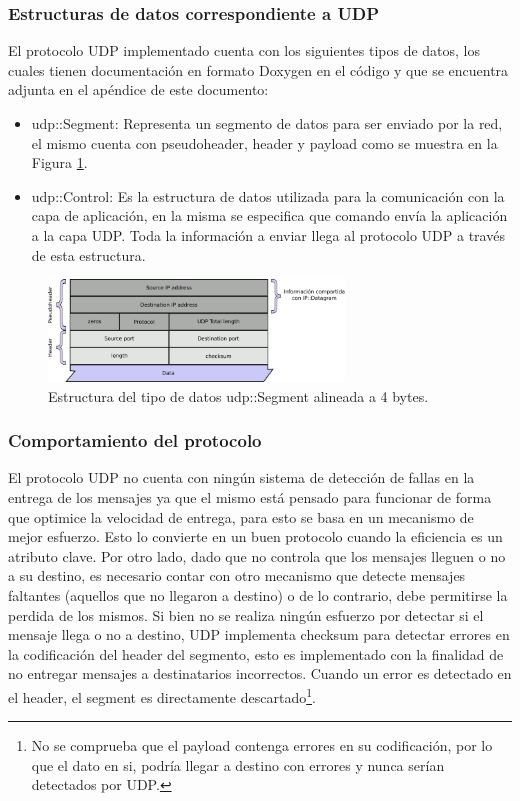 \documentclass[10pt,a4paper]{article}
\begin{document}
\subsubsection{Estructuras de datos correspondiente a UDP}

El protocolo UDP implementado cuenta con los siguientes tipos de datos, los cuales tienen documentación en formato Doxygen en el código y que se encuentra adjunta en el apéndice de este documento:

\begin{itemize}
\item udp::Segment: Representa un segmento de datos para ser enviado por la red, el mismo cuenta con pseudoheader, header y payload como se muestra en la Figura \ref{figure: udp segment}.
\item udp::Control: Es la estructura de datos utilizada para la comunicación con la capa de aplicación, en la misma se especifica que comando envía la aplicación a la capa UDP. Toda la información a enviar llega al protocolo UDP a través de esta estructura.
\end{itemize}

\begin{figure}[!htb]
    \centering
    \includegraphics[width = 0.7\textwidth]{img/png/UDP-Segment.png}
    \caption{Estructura del tipo de datos udp::Segment alineada a 4 bytes.}
    \label{figure: udp segment}
\end{figure}

\subsubsection{Comportamiento del protocolo}

El protocolo UDP no cuenta con ningún sistema de detección de fallas en la entrega de los mensajes ya que el mismo está pensado para funcionar de forma que optimice la velocidad de entrega, para esto se basa en un mecanismo de mejor esfuerzo. Esto lo convierte en un buen protocolo cuando la eficiencia es un atributo clave. Por otro lado, dado que no controla que los mensajes lleguen o no a su destino, es necesario contar con otro mecanismo que detecte mensajes faltantes (aquellos que no llegaron a destino) o de lo contrario, debe permitirse la perdida de los mismos. Si bien no se realiza ningún esfuerzo por detectar si el mensaje llega o no a destino, UDP implementa checksum para detectar errores en la codificación del header del segmento, esto es implementado con la finalidad de no entregar mensajes a destinatarios incorrectos. Cuando un error es detectado en el header, el segment es directamente descartado\footnote{No se comprueba que el payload contenga errores en su codificación, por lo que el dato en si, podría llegar a destino con errores y nunca serían detectados por UDP.}.\\
\end{document}
